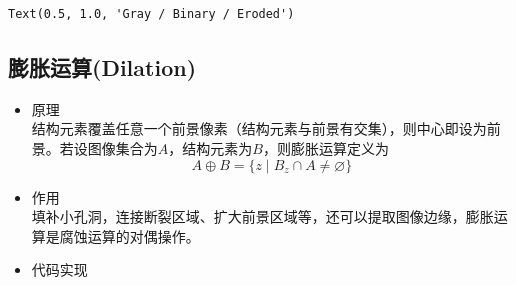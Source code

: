 \documentclass[11pt]{article}
\makeatletter
\newcommand{\boxspacing}{\kern\kvtcb@left@rule\kern\kvtcb@boxsep}
\newcommand{\prompt}[4]{
	{\ttfamily\llap{{\color{#2}[#3]:\hspace{3pt}#4}}\vspace{-\baselineskip}}
}
\makeatother
\begin{document}
            \begin{tcolorbox}[breakable, size=fbox, boxrule=.5pt, pad at break*=1mm, opacityfill=0]
\begin{Verbatim}[commandchars=\\\{\}]
Text(0.5, 1.0, 'Gray / Binary / Eroded')
\end{Verbatim}
\end{tcolorbox}
        
    \begin{center}
    \end{center}
    
    
    \subsection{膨胀运算(Dilation)}
    \begin{itemize}
    	\item 原理\\
    	结构元素覆盖任意一个前景像素（结构元素与前景有交集），则中心即设为前景。若设图像集合为$A$，结构元素为$B$，则膨胀运算定义为
    	$$A\oplus B = \{z\mid B_z\cap A\neq\varnothing\}$$
    	\item 作用\\
    	填补小孔洞，连接断裂区域、扩大前景区域等，还可以提取图像边缘，膨胀运算是腐蚀运算的对偶操作。
    	\item 代码实现
    	\begin{center}
    	\end{center}
    \end{itemize}
    
\end{document}
